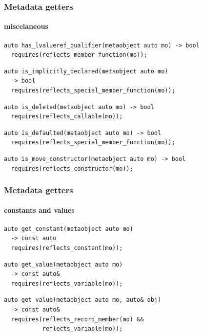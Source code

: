 \documentclass[compress,table,xcolor=table]{beamer}
\begin{document}
\begin{frame}[fragile]
  \frametitle{Metadata getters}
  \framesubtitle{miscelaneous}
  \begin{lstlisting}[language=c++2x,basicstyle=\scriptsize\ttfamily]
auto has_lvalueref_qualifier(metaobject auto mo) -> bool
  requires(reflects_member_function(mo));
  \end{lstlisting}
  \vfill
  \begin{lstlisting}[language=c++2x,basicstyle=\footnotesize\ttfamily]
auto is_implicitly_declared(metaobject auto mo)
  -> bool
  requires(reflects_special_member_function(mo));
  \end{lstlisting}
  \vfill
  \begin{lstlisting}[language=c++2x,basicstyle=\footnotesize\ttfamily]
auto is_deleted(metaobject auto mo) -> bool
  requires(reflects_callable(mo));
  \end{lstlisting}
  \vfill
  \begin{lstlisting}[language=c++2x,basicstyle=\footnotesize\ttfamily]
auto is_defaulted(metaobject auto mo) -> bool
  requires(reflects_special_member_function(mo));
  \end{lstlisting}
  \vfill
  \begin{lstlisting}[language=c++2x,basicstyle=\footnotesize\ttfamily]
auto is_move_constructor(metaobject auto mo) -> bool
  requires(reflects_constructor(mo));
  \end{lstlisting}
\end{frame}
\begin{frame}[fragile]
  \frametitle{Metadata getters}
  \framesubtitle{constants and values}
  \begin{lstlisting}[language=c++2x,basicstyle=\small\ttfamily]
auto get_constant(metaobject auto mo)
  -> const auto
  requires(reflects_constant(mo));
  \end{lstlisting}
  \vfill
  \begin{lstlisting}[language=c++2x,basicstyle=\small\ttfamily]
auto get_value(metaobject auto mo)
  -> const auto&
  requires(reflects_variable(mo));
  \end{lstlisting}
  \vfill
  \begin{lstlisting}[language=c++2x,basicstyle=\small\ttfamily]
auto get_value(metaobject auto mo, auto& obj)
  -> const auto&
  requires(reflects_record_member(mo) &&
           reflects_variable(mo));
  \end{lstlisting}
\end{frame}
\end{document}
